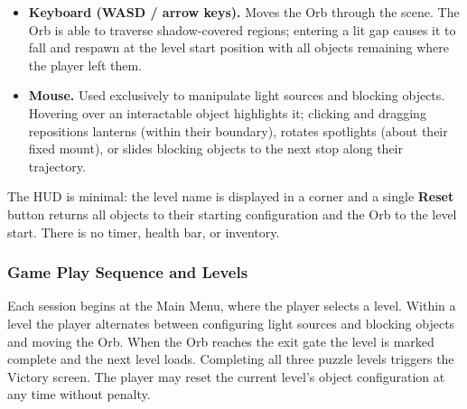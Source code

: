 \documentclass[11pt, letterpaper]{article}
\begin{document}
        \begin{itemize}[leftmargin=1.5em, itemsep=2pt]
            \item \textbf{Keyboard (WASD / arrow keys).} Moves the Orb through the
                  scene. The Orb is able to traverse shadow-covered regions; entering a
                  lit gap causes it to fall and respawn at the level start position
                  with all objects remaining where the player left them.
            \item \textbf{Mouse.} Used exclusively to manipulate light sources and
                  blocking objects. Hovering over an interactable object highlights it;
                  clicking and dragging repositions lanterns (within their boundary),
                  rotates spotlights (about their fixed mount), or slides blocking
                  objects to the next stop along their trajectory.
        \end{itemize}

        The HUD is minimal: the level name is displayed in a corner and a single
        \textbf{Reset} button returns all objects to their starting configuration and
        the Orb to the level start. There is no timer, health bar, or inventory.

        \subsubsection{Game Play Sequence and Levels}
        Each session begins at the Main Menu, where the player selects a level. Within
        a level the player alternates between configuring light sources and blocking
        objects and moving the Orb. When the Orb reaches the exit gate the level is
        marked complete and the next level loads. Completing all three puzzle levels
        triggers the Victory screen. The player may reset the current level's object
        configuration at any time without penalty.
\end{document}
